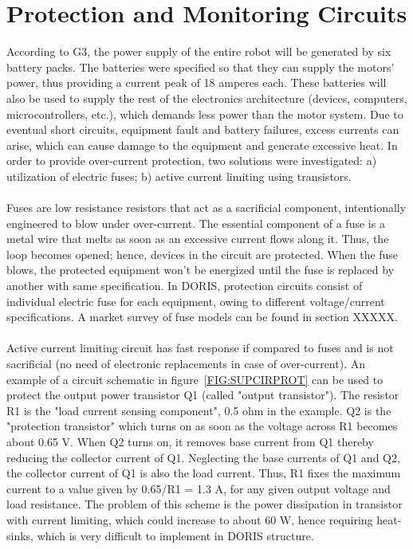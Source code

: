 \section{Protection and Monitoring Circuits}
According to G3, the power supply of the entire robot will be generated by six battery packs. The batteries were specified so that they can supply the motors' power, thus providing a current peak of 18 amperes each. These batteries will also be used to supply the rest of the electronics architecture (devices, computers, microcontrollers, etc.), which demands less power than the motor system. Due to eventual short circuits, equipment fault and battery failures, excess currents can arise, which can cause damage to the equipment and generate excessive heat. In order to provide over-current protection, two solutions were investigated: a) utilization of electric fuses; b) active current limiting using transistors.\\
\\
Fuses are low resistance resistors that act as a sacrificial component, intentionally engineered to blow under over-current. The essential component of a fuse is a metal wire that melts as soon as an excessive current flows along it. Thus, the loop becomes opened; hence, devices in the circuit are protected. When the fuse blows, the protected equipment won't be energized until the fuse is replaced by another with same specification. In DORIS, protection circuits consist of individual electric fuse for each equipment, owing to different voltage/current specifications. A market survey of fuse models can be found in section XXXXX.\\
\\
Active current limiting circuit has fast response if compared to fuses and is not sacrificial (no need of electronic replacements in case of over-current). An example of a circuit schematic in figure~\ref{FIG:SUPCIRPROT} can be used to protect the output power transistor Q1 (called "output transistor"). The resistor R1 is the "load current sensing component", 0.5 ohm in the example. Q2 is the "protection transistor" which turns on as soon as the voltage across R1 becomes about 0.65 V. When Q2 turns on, it removes base current from Q1 thereby reducing the collector current of Q1. Neglecting the base currents of Q1 and Q2, the collector current of Q1 is also the load current. Thus, R1 fixes the maximum current to a value given by 0.65/R1 = 1.3 A, for any given output voltage and load resistance. The problem of this scheme is the power dissipation in transistor with current limiting, which could increase to about 60 W, hence requiring heat-sinks, which is very difficult to implement in DORIS structure.
